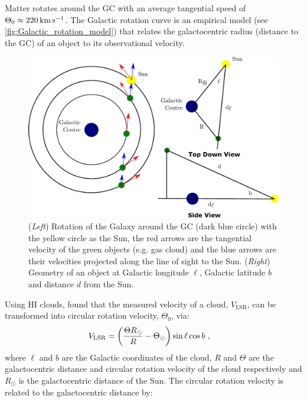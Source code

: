 Matter rotates around the GC with an average tangential speed of $\Theta_0\approx 220\,\si{\kilo\meter\per\second}$. The Galactic rotation curve is an empirical model (see \autoref{fig:Galactic_rotation_model}) that relates the galactocentric radius (distance to the GC) of an object to its observational velocity.
\begin{figure}[b!]
	\centering
	\includegraphics[width=1.0\textwidth]{06_Interstellar_Medium/Images/Theory/galaxy_combined.pdf}
	\caption{(\textit{Left}) Rotation of the Galaxy around the GC (dark blue circle) with the yellow circle as the Sun, the red arrows are the tangential velocity of the green objects (e.g. gas cloud) and the blue arrows are their velocities projected along the line of sight to the Sun. (\textit{Right}) Geometry of an object at Galactic longitude $\ell$, Galactic latitude $b$ and distance $d$ from the Sun.}
	\label{fig:Galactic_rotation_model}
\end{figure}
Using HI clouds, \cite{1993A&A...275...67B} found that the measured velocity of a cloud, $V_\text{LSR}$, can be transformed into circular rotation velocity, $\Theta_0$, via:
\begin{equation}
\begin{aligned}
    V_\text{LSR}&=\qty(\frac{\Theta R_\odot}{R}-\Theta_\odot)\sin\ell \cos b\text{ ,}
\end{aligned} \label{eq:chapter_6_brand_blitz_velocity}
\end{equation}
\noindent where $\ell$ and $b$ are the Galactic coordinates of the cloud, $R$ and $\Theta$ are the galactocentric distance and circular rotation velocity of the cloud respectively and $R_\odot$ is the galactocentric distance of the Sun. The circular rotation velocity is related to the galactocentric distance by:

